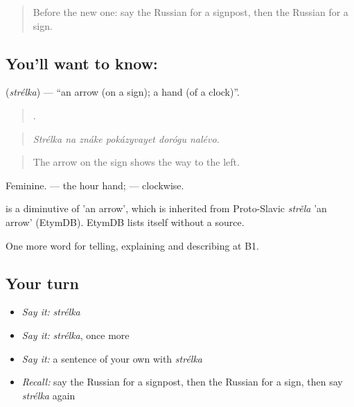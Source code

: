 \label{lesson:RU-C438-strelka}



\begin{quote}
Before the new one: say the Russian for a signpost, then the Russian for a sign.
\end{quote}

\subsection*{You'll want to know: }
\textbf{} (\emph{strélka}) — \textquotedblleft{}an arrow (on a sign); a hand (of a clock)\textquotedblright{}.

\begin{quote}
     .
\end{quote}

\begin{quote}
\emph{Strélka na znáke pokázyvayet dorógu nalévo.}
\end{quote}

\begin{quote}
The arrow on the sign shows the way to the left.
\end{quote}

Feminine. \emph{ } — the hour hand; \emph{  } — clockwise.

\begin{cousinweb}
\emph{} is a diminutive of \emph{} 'an arrow', which is inherited from Proto-Slavic \emph{strěla} 'an arrow' (EtymDB). EtymDB lists \emph{} itself without a source.
\end{cousinweb}

\begin{grammarlens}[title={What you've built}]
One more word for telling, explaining and describing at B1.
\end{grammarlens}

\subsection*{Your turn}
\begin{itemize}
\raggedright
  \item \emph{Say it:} \emph{strélka}
  \item \emph{Say it:} \emph{strélka}, once more
  \item \emph{Say it:} a sentence of your own with \emph{strélka}
  \item \emph{Recall:} say the Russian for a signpost, then the Russian for a sign, then say \emph{strélka} again
\end{itemize}


